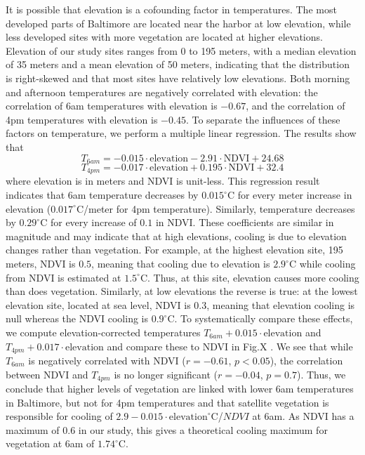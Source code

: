 \documentclass[draft,linenumbers]{agujournal}
\begin{document}
It is possible that elevation is a cofounding factor in temperatures. The most developed parts of Baltimore are located near the harbor at low elevation, while less developed sites with more vegetation are located at higher elevations. Elevation of our study sites ranges from 0 to 195 meters, with a median elevation of 35 meters and a mean elevation of 50 meters, indicating that the distribution is right-skewed and that most sites have relatively low elevations. Both morning and afternoon temperatures are negatively correlated with elevation: the correlation of 6am temperatures with elevation is $-0.67$, and the correlation of 4pm temperatures with elevation is $-0.45$. To separate the influences of these factors on temperature, we perform a multiple linear regression. The results show that 
\[ T_{6am} = -0.015\cdot \text{elevation} -2.91 \cdot \text{NDVI} + 24.68\] 
\[ T_{4pm} = -0.017\cdot \text{elevation} +0.195 \cdot \text{NDVI} + 32.4\]
where elevation is in meters and NDVI is unit-less. 
This regression result indicates that 6am temperature decreases by $0.015^\circ$C for every meter increase in elevation ($0.017^\circ$C/meter for 4pm temperature). Similarly, temperature decreases by $0.29^\circ$C for every increase of $0.1$ in NDVI. 
These coefficients are similar in magnitude and may indicate that at high elevations, cooling is due to elevation changes rather than vegetation.
 For example, at the highest elevation site, 195 meters, NDVI is $0.5$, meaning that cooling due to elevation is $2.9^\circ$C while cooling from NDVI is estimated at $1.5^\circ$C. Thus, at this site, elevation causes more cooling than does vegetation. 
 Similarly, at low elevations the reverse is true: at the lowest elevation site, located at sea level, NDVI is $0.3$, meaning that elevation cooling is null whereas the NDVI cooling is  $0.9^\circ$C. 
To systematically compare these effects, 
we compute elevation-corrected temperatures $T_{6am} + 0.015\cdot \text{elevation}$ and $T_{4pm} + 0.017\cdot \text{elevation}$ and compare these to NDVI in Fig.X . We see that while $T_{6am}$ is negatively correlated with NDVI ($r=-0.61$, $p<0.05$), the correlation between NDVI and $T_{4pm}$ is no longer significant ($r=-0.04$, $p=0.7$). 
Thus, we conclude that higher levels of vegetation are linked with lower 6am temperatures in Baltimore, but not for 4pm temperatures and that satellite vegetation is responsible for cooling of $2.9 - 0.015\cdot \text{elevation} ^\circ$C/$NDVI$ at 6am. As NDVI has a maximum of $0.6$ in our study, this gives a theoretical cooling maximum for vegetation at 6am of  $1.74^\circ$C. 
\end{document}
